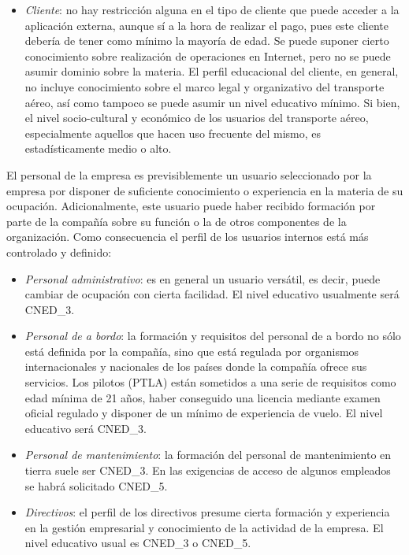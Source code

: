 \documentclass[11pt, a4paper, twoside, titlepage]{article}
\begin{document}
			\begin{itemize}
				\item \textit{Cliente}: no hay restricción alguna en el tipo de cliente que puede acceder a la aplicación externa, aunque sí a la hora de realizar el pago, pues este cliente debería de tener como mínimo la mayoría de edad. Se puede suponer cierto conocimiento sobre realización de operaciones en \gls{Internet}, pero no se puede asumir dominio sobre la materia. El perfil educacional del cliente, en general, no incluye conocimiento sobre el marco legal y organizativo del transporte aéreo, así como tampoco se puede asumir un nivel educativo mínimo. Si bien, el nivel socio-cultural y económico de los usuarios del transporte aéreo, especialmente aquellos que hacen uso frecuente del mismo, es estadísticamente medio o alto.
			\end{itemize}

			El personal de la empresa es previsiblemente un usuario seleccionado por la empresa por disponer de suficiente conocimiento o experiencia en la materia de su ocupación. Adicionalmente, este usuario puede haber recibido formación por parte de la compañía sobre su función o la de otros componentes de la organización. Como consecuencia el perfil de los usuarios internos está más controlado y definido:
			\begin{itemize}
				\item \textit{Personal administrativo}: es en general un usuario versátil, es decir, puede cambiar de ocupación con cierta facilidad. El nivel educativo usualmente será \gls{CNED_3}.
				\item \textit{Personal de a bordo}: la formación y requisitos del personal de a bordo no sólo está definida por la compañía, sino que está regulada por organismos internacionales y nacionales de los países donde la compañía ofrece sus servicios. Los pilotos  (\gls{PTLA}) están sometidos a una serie de requisitos como edad mínima de 21 años, haber conseguido una licencia mediante examen oficial regulado y disponer de un mínimo de experiencia de vuelo. El nivel educativo será \gls{CNED_3}.
				\item \textit{Personal de mantenimiento}: la formación del personal de mantenimiento en tierra suele ser \gls{CNED_3}. En las exigencias de acceso de algunos empleados se habrá solicitado \gls{CNED_5}.
				\item \textit{Directivos}: el perfil de los directivos presume cierta formación y experiencia en la gestión empresarial y conocimiento de la actividad de la empresa. El nivel educativo usual es \gls{CNED_3} o \gls{CNED_5}.
			\end{itemize}
\end{document}
